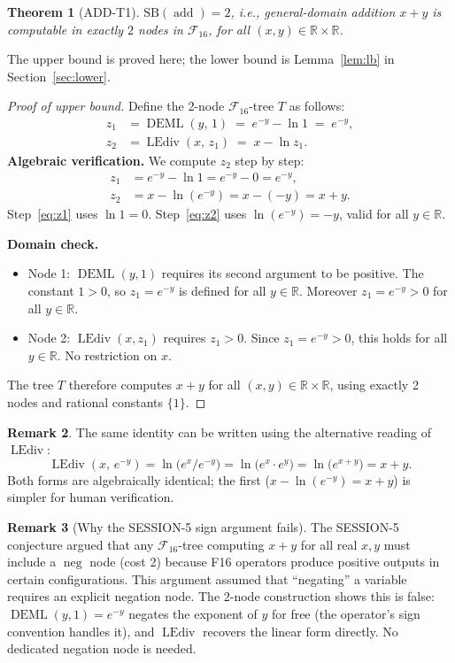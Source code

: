 \documentclass[12pt,a4paper]{article}
\newtheorem{theorem}{Theorem}[section]
\theoremstyle{definition}
\newtheorem{remark}[theorem]{Remark}
\newcommand{\DEML}{\operatorname{DEML}}
\newcommand{\LEdiv}{\operatorname{LEdiv}}
\newcommand{\addop}{\operatorname{add}}
\newcommand{\negop}{\operatorname{neg}}
\newcommand{\SB}{\mathrm{SB}}
\newcommand{\F}{\mathcal{F}_{16}}
\newcommand{\R}{\mathbb{R}}
\begin{document}
\begin{theorem}[ADD-T1]
\label{thm:add_t1}
$\SB(\addop) = 2$, i.e., general-domain addition $x + y$ is computable in
exactly $2$ nodes in $\F$, for all $(x, y) \in \R \times \R$.
\end{theorem}

The upper bound is proved here; the lower bound is Lemma~\ref{lem:lb} in
Section~\ref{sec:lower}.

\begin{proof}[Proof of upper bound]
Define the 2-node $\F$-tree $T$ as follows:
\begin{align*}
  z_1 &= \DEML(y,\, 1) \;=\; e^{-y} - \ln 1 \;=\; e^{-y}, \\
  z_2 &= \LEdiv(x,\, z_1) \;=\; x - \ln z_1.
\end{align*}
\textbf{Algebraic verification.}
We compute $z_2$ step by step:
\begin{align}
  z_1 &= e^{-y} - \ln 1 = e^{-y} - 0 = e^{-y},
  \label{eq:z1} \\
  z_2 &= x - \ln(e^{-y})
       = x - (-y)
       = x + y.
  \label{eq:z2}
\end{align}
Step~\eqref{eq:z1} uses $\ln 1 = 0$.
Step~\eqref{eq:z2} uses $\ln(e^{-y}) = -y$, valid for all $y \in \R$.

\textbf{Domain check.}
\begin{itemize}
  \item Node 1: $\DEML(y, 1)$ requires its second argument to be positive.
    The constant $1 > 0$, so $z_1 = e^{-y}$ is defined for all $y \in \R$.
    Moreover $z_1 = e^{-y} > 0$ for all $y \in \R$.
  \item Node 2: $\LEdiv(x, z_1)$ requires $z_1 > 0$.
    Since $z_1 = e^{-y} > 0$, this holds for all $y \in \R$.
    No restriction on $x$.
\end{itemize}
The tree $T$ therefore computes $x + y$ for all $(x, y) \in \R \times \R$,
using exactly 2 nodes and rational constants $\{1\}$.
\end{proof}

\begin{remark}
The same identity can be written using the alternative reading of $\LEdiv$:
\[
  \LEdiv(x,\, e^{-y})
  = \ln\!\bigl(e^x / e^{-y}\bigr)
  = \ln\!\bigl(e^x \cdot e^y\bigr)
  = \ln\!\bigl(e^{x+y}\bigr)
  = x + y.
\]
Both forms are algebraically identical; the first ($x - \ln(e^{-y}) = x + y$)
is simpler for human verification.
\end{remark}

\begin{remark}[Why the SESSION-5 sign argument fails]
The SESSION-5 conjecture argued that any $\F$-tree computing $x + y$ for all
real $x, y$ must include a $\negop$ node (cost 2) because F16 operators produce
positive outputs in certain configurations.
This argument assumed that ``negating'' a variable requires an explicit negation
node.
The 2-node construction shows this is false: $\DEML(y, 1) = e^{-y}$ negates the
exponent of $y$ for free (the operator's sign convention handles it), and
$\LEdiv$ recovers the linear form directly.
No dedicated negation node is needed.
\end{remark}
\end{document}
